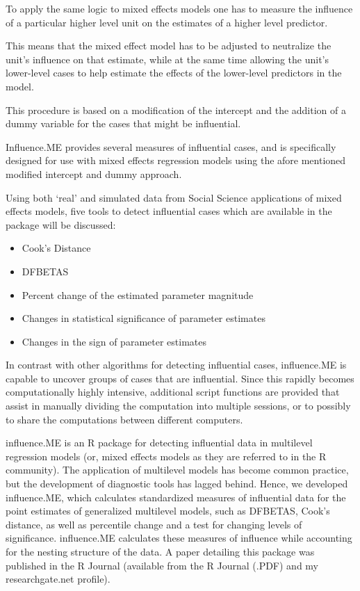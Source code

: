 To apply the same logic to mixed effects models one has to measure the influence of a particular higher
level unit on the estimates of a higher level predictor. 

This means that the mixed effect model has to
be adjusted to neutralize the unit’s influence on that estimate, while at the same time allowing the unit’s
lower-level cases to help estimate the effects of the lower-level predictors in the model. 

This procedure is
based on a modification of the intercept and the addition of a dummy variable for the cases that might be
influential. 

Influence.ME provides several measures of influential cases, and is specifically designed for use
with mixed effects regression models using the afore mentioned modified intercept and dummy approach.

Using both ‘real’ and simulated data from Social Science applications of mixed effects models, five tools to
detect influential cases which are available in the package will be discussed:
\begin{itemize}
\item Cook’s Distance
\item DFBETAS
\item Percent change of the estimated parameter magnitude
\item Changes in statistical significance of parameter estimates
\item Changes in the sign of parameter estimates
\end{itemize}
In contrast with other algorithms for detecting influential cases, influence.ME is capable to uncover
groups of cases that are influential. Since this rapidly becomes computationally highly intensive, additional
script functions are provided that assist in manually dividing the computation into multiple sessions, or to
possibly to share the computations between different computers.


influence.ME is an R package for detecting influential data in multilevel regression models (or, mixed effects models as they are referred to in the R community). The application of multilevel models has become common practice, but the development of diagnostic tools has lagged behind. Hence, we developed influence.ME, which calculates standardized measures of influential data for the point estimates of generalized multilevel models, such as DFBETAS, Cook’s distance, as well as percentile change and a test for changing levels of significance. influence.ME calculates these measures of influence while accounting for the nesting structure of the data. A paper detailing this package was published in the R Journal (available from the R Journal (.PDF) and my researchgate.net profile).

